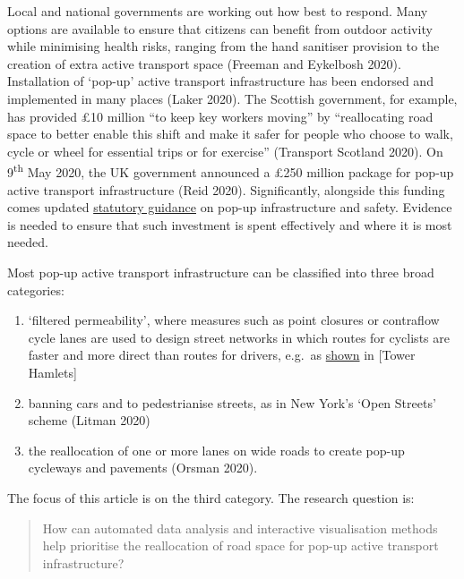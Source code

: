 \documentclass[
]{article}
\providecommand{\tightlist}{%
  \setlength{\itemsep}{0pt}\setlength{\parskip}{0pt}}
\begin{document}
Local and national governments are working out how best to respond.
Many options are available to ensure that citizens can benefit from outdoor activity while minimising health risks, ranging from the hand sanitiser provision to the creation of extra active transport space (Freeman and Eykelbosh 2020).
Installation of `pop-up' active transport infrastructure has been endorsed and implemented in many places (Laker 2020).
The Scottish government, for example, has provided £10 million ``to keep key workers moving'' by ``reallocating road space to better enable this shift and make it safer for people who choose to walk, cycle or wheel for essential trips or for exercise'' (Transport Scotland 2020).
On 9\textsuperscript{th} May 2020, the UK government announced a £250 million package for pop-up active transport infrastructure (Reid 2020).
Significantly, alongside this funding comes updated \href{https://www.gov.uk/government/publications/reallocating-road-space-in-response-to-covid-19-statutory-guidance-for-local-authorities/traffic-management-act-2004-network-management-in-response-to-covid-19}{statutory guidance} on pop-up infrastructure and safety.
Evidence is needed to ensure that such investment is spent effectively and where it is most needed.

Most pop-up active transport infrastructure can be classified into three broad categories:

\begin{enumerate}
\def\labelenumi{\arabic{enumi}.}
\tightlist
\item
  `filtered permeability', where measures such as point closures or contraflow cycle lanes are used to design street networks in which routes for cyclists are faster and more direct than routes for drivers, e.g.~as \href{https://twitter.com/TowerHamletsNow/status/1257564043856019458}{shown} in {[}Tower Hamlets{]}
\item
  banning cars and to pedestrianise streets, as in New York's `Open Streets' scheme (Litman 2020)
\item
  the reallocation of one or more lanes on wide roads to create pop-up cycleways and pavements (Orsman 2020).
\end{enumerate}

The focus of this article is on the third category.
The research question is:

\begin{quote}
How can automated data analysis and interactive visualisation methods help prioritise the reallocation of road space for pop-up active transport infrastructure?
\end{quote}
\end{document}
